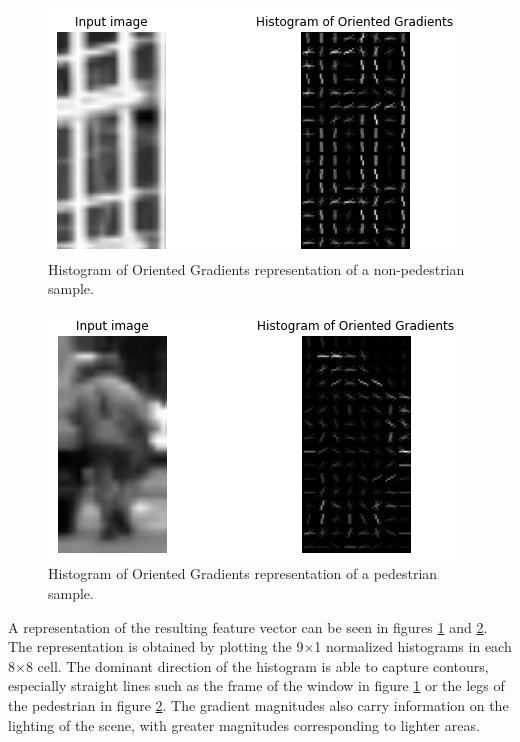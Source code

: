 \documentclass[journal,twocolumn]{IEEEtran}
\begin{document}
\begin{figure}[H]
\centering
\includegraphics[keepaspectratio,width=0.9\columnwidth]{3}
\caption[HOG representation of a non-pedestrian sample]{Histogram of Oriented Gradients representation of a non-pedestrian sample.}
\label{fig:3}
\end{figure}
\begin{figure}[H]
\centering
\includegraphics[keepaspectratio,width=0.9\columnwidth]{4}
\caption[HOG representation of a pedestrian sample]{Histogram of Oriented Gradients representation of a pedestrian sample.}
\label{fig:4}
\end{figure}

A representation of the resulting feature vector can be seen in figures \ref{fig:3} and \ref{fig:4}. The representation is obtained by plotting the 9$\times$1 normalized histograms in each 8$\times$8 cell. The dominant direction of the histogram is able to capture contours, especially straight lines such as the frame of the window in figure \ref{fig:3} or the legs of the pedestrian in figure \ref{fig:4}. The gradient magnitudes also carry information on the lighting of the scene, with greater magnitudes corresponding to lighter areas.
\end{document}
